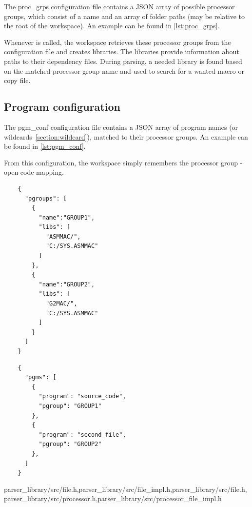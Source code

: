 The proc\_grps configuration file contains a JSON array of possible processor groups, which consist of a name and an array of folder paths (may be relative to the root of the workspace). An example can be found in \cref{lst:proc_grps}.

Whenever  is called, the workspace retrieves these processor groups from the configuration file and creates libraries. The libraries provide information about paths to their dependency files. During parsing, a needed library is found based on the matched processor group name and used to search for a wanted macro or copy file. 

\subsection{Program configuration}

The pgm\_conf configuration file contains a JSON array of program names (or wildcards~\ref{section:wildcard}), matched to their processor groups. An example can be found in \cref{lst:pgm_conf}.


From this configuration, the workspace simply remembers the processor group - open code mapping.


\begin{listing}[t]
	\begin{verbatim}
	{
	  "pgroups": [
	    {
	      "name":"GROUP1",
	      "libs": [
	        "ASMMAC/",
	        "C:/SYS.ASMMAC"
	      ]
	    },
	    {
	      "name":"GROUP2",
	      "libs": [
	        "G2MAC/",
	        "C:/SYS.ASMMAC"
	      ]
	    }
	  ]
	}
	\end{verbatim}
	\caption{A processor group configuration file}
	\label{lst:proc_grps}
\end{listing}

\begin{listing}[t]
	\begin{verbatim}
	{
	  "pgms": [
	    {
	      "program": "source_code",
	      "pgroup": "GROUP1"
	    },
	    {
	      "program": "second_file",
	      "pgroup": "GROUP2"
	    },
	  ]
	}
	\end{verbatim}
	\caption{A program configuration file}
	\label{lst:pgm_conf}
\end{listing}

{parser\_library/src/file.h,parser\_library/src/file\_impl.h,parser\_library/src/file.h,parser\_library/src/processor.h,parser\_library/src/processor\_file\_impl.h}

